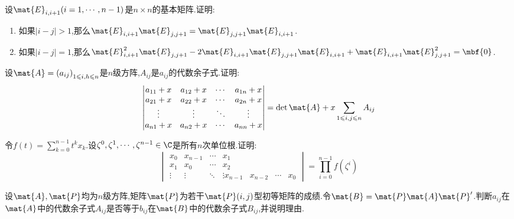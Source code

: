 \documentclass{ctexart}
\begin{document}
\begin{homework}[5(10')]
    设$\mat{E}_{i,i+1}(i=1,\cdots,n-1)$是$n\times n$的基本矩阵.证明:
    \begin{enumerate}[label=\tbf{(\arabic*)},topsep=0pt,parsep=0pt,itemsep=0pt,partopsep=0pt]
        \item 如果$\left|i-j\right|>1$,那么$\mat{E}_{i,i+1}\mat{E}_{j,j+1}=\mat{E}_{j,j+1}\mat{E}_{i,i+1}$.
        \item 如果$\left|i-j\right|=1$,那么$\mat{E}_{i,i+1}^2\mat{E}_{j,j+1}-2\mat{E}_{i,i+1}\mat{E}_{j,j+1}\mat{E}_{i,i+1}+\mat{E}_{i,i+1}\mat{E}_{j,j+1}^2=\mbf{0}$.
    \end{enumerate}
\end{homework}
\begin{homework}[6(10')]
    设$\mat{A}=\left(a_{ij}\right)_{1\leqslant i,h\leqslant n}$是$n$级方阵,$A_{ij}$是$a_{ij}$的代数余子式.证明:
    \[\begin{vmatrix}
        a_{11}+x&a_{12}+x&\cdots&a_{1n}+x\\
        a_{21}+x&a_{22}+x&\cdots&a_{2n}+x\\
        \vdots&\vdots&\ddots&\vdots\\
        a_{n1}+x&a_{n2}+x&\cdots&a_{nn}+x
    \end{vmatrix}=\det\mat{A}+x\sum_{1\leqslant i,j\leqslant n}A_{ij}\]
\end{homework}
\begin{homework}[7(10')]
    令$f(t)=\displaystyle\sum_{k=0}^{n-1}t^kx_k$.设$\zeta^0,\zeta^1,\cdots,\zeta^{n-1}\in\C$是所有$n$次单位根.证明:
    \[\begin{vmatrix}
        x_0&x_{n-1}&\cdots&x_1\\
        x_1&x_0&\cdots&x_2\\
        \vdots&\vdots&\ddots&\vdots
        x_{n-1}&x_{n-2}&\cdots&x_0
    \end{vmatrix}=\prod_{i=0}^{n-1}f\left(\zeta^{i}\right)\]
\end{homework}
\begin{homework}[8(10')]
    设$\mat{A},\mat{P}$均为$n$级方阵,矩阵$\mat{P}$为若干$\mat{P}(i,j)$型初等矩阵的成绩.令$\mat{B}=\mat{P}\mat{A}\mat{P}'$.判断$a_{ij}$在$\mat{A}$中的代数余子式$A_{ij}$是否等于$b_{ij}$在$\mat{B}$中的代数余子式$B_{ij}$,并说明理由.
\end{homework}
\end{document}
